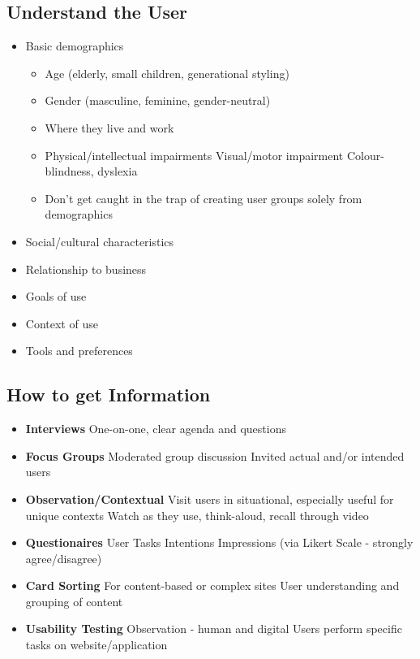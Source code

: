 \subsection{Understand the User}
\begin{itemize}
	\item Basic demographics
	\begin{itemize}
		\item Age (elderly, small children, generational styling)
		\item Gender (masculine, feminine, gender-neutral)
		\item Where they live and work
		\item Physical/intellectual impairments
		\subitem Visual/motor impairment
		\subitem Colour-blindness, dyslexia
		\item Don't get caught in the trap of creating user groups solely from demographics
	\end{itemize}
	\item Social/cultural characteristics
	\item Relationship to business
	\item Goals of use
	\item Context of use
	\item Tools and preferences	
\end{itemize}

\subsection{How to get Information}
\begin{itemize}
	\item\textbf{Interviews}
	\subitem One-on-one, clear agenda and questions
	\item\textbf{Focus Groups}
	\subitem Moderated group discussion
	\subitem Invited actual and/or intended users
	\item\textbf{Observation/Contextual}
	\subitem Visit users in situational, especially useful for unique contexts
	\subitem Watch as they use, think-aloud, recall through video
	\item\textbf{Questionaires}
	\subitem User Tasks
	\subitem Intentions
	\subitem Impressions (via Likert Scale - strongly agree/disagree)
	\item\textbf{Card Sorting}
	\subitem For content-based or complex sites
	\subitem User understanding and grouping of content
	\item\textbf{Usability Testing}
	\subitem Observation - human and digital
	\subitem Users perform specific tasks on website/application	
\end{itemize}

